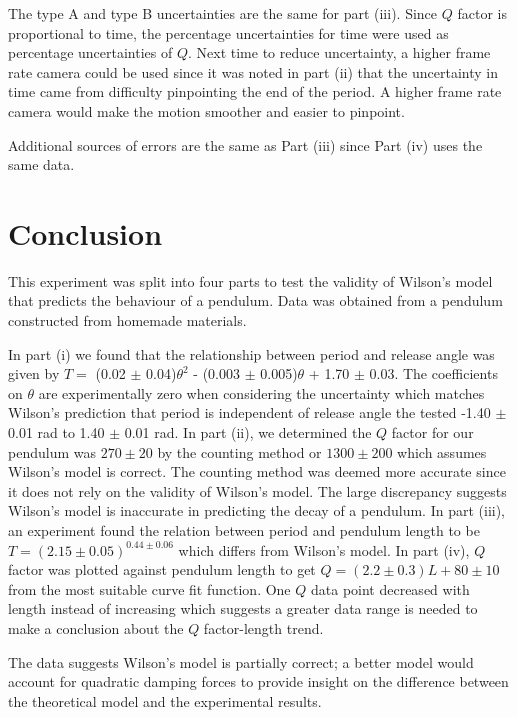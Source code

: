 \documentclass[notitlepage, twocolumn, 12pt]{article}
\begin{document}
    The type A and type B uncertainties are the same for part (iii). Since $Q$ factor is proportional to time, the percentage uncertainties for time were used as percentage uncertainties of $Q$. Next time to reduce uncertainty, a higher frame rate camera could be used since it was noted in part (ii) that the uncertainty in time came from difficulty pinpointing the end of the period. A higher frame rate camera would make the motion smoother and easier to pinpoint. 

    Additional sources of errors are the same as Part (iii) since Part (iv) uses the same data.

    \section*{Conclusion}
    This experiment was split into four parts to test the validity of Wilson's model that predicts the behaviour of a pendulum. Data was obtained from a pendulum constructed from homemade materials. 
    
    In part (i) we found that the relationship between period and release angle was given by $T=$ (0.02 $\pm$ 0.04)$\theta^2$ - (0.003 $\pm$ 0.005)$\theta$ + 1.70 $\pm$ 0.03. The coefficients on $\theta$ are experimentally zero when considering the uncertainty which matches Wilson's prediction that period is independent of release angle the tested -1.40 $\pm$ 0.01 rad to 1.40 $\pm$ 0.01 rad. 
    In part (ii), we determined the $Q$ factor for our pendulum was $270 \pm 20$ by the counting method or $1300 \pm 200$ which assumes Wilson's model is correct. The counting method was deemed more accurate since it does not rely on the validity of Wilson's model. The large discrepancy suggests Wilson's model is inaccurate in predicting the decay of a pendulum.
    In part (iii), an experiment found the relation between period and pendulum length to be $T = (2.15 \pm 0.05)^{0.44\pm 0.06}$ which differs from Wilson's model.
    In part (iv), $Q$ factor was plotted against pendulum length to get $Q = (2.2 \pm 0.3)L + 80 \pm 10$ from the most suitable curve fit function. One $Q$ data point decreased with length instead of increasing which suggests a greater data range is needed to make a conclusion about the $Q$ factor-length trend.
    
    The data suggests Wilson's model is partially correct; a better model would account for quadratic damping forces to provide insight on the difference between the theoretical model and the experimental results.
\end{document}
